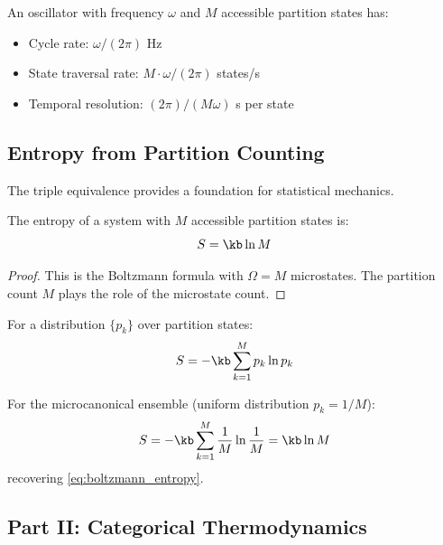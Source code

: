 An oscillator with frequency $\omega$ and $M$ accessible partition states has:
\begin{itemize}
    \item Cycle rate: $\omega/(2\pi)$ Hz
    \item State traversal rate: $M \cdot \omega/(2\pi)$ states/s
    \item Temporal resolution: $(2\pi)/(M\omega)$ s per state
\end{itemize}

\subsection{Entropy from Partition Counting}

The triple equivalence provides a foundation for statistical mechanics.

\begin{corollary}
The entropy of a system with $M$ accessible partition states is:
\begin{equation}
S = \kb \ln M
\label{eq:boltzmann_entropy}
\end{equation}
\end{corollary}

\begin{proof}
This is the Boltzmann formula with $\Omega = M$ microstates. The partition count $M$ plays the role of the microstate count.
\end{proof}

\begin{corollary}
For a distribution $\{p_k\}$ over partition states:
\begin{equation}
S = -\kb \sum_{k=1}^{M} p_k \ln p_k
\label{eq:gibbs_entropy}
\end{equation}
\end{corollary}

For the microcanonical ensemble (uniform distribution $p_k = 1/M$):
\begin{equation}
S = -\kb \sum_{k=1}^{M} \frac{1}{M} \ln \frac{1}{M} = \kb \ln M
\end{equation}
recovering \eqref{eq:boltzmann_entropy}.


\subsection*{Part II: Categorical Thermodynamics}

